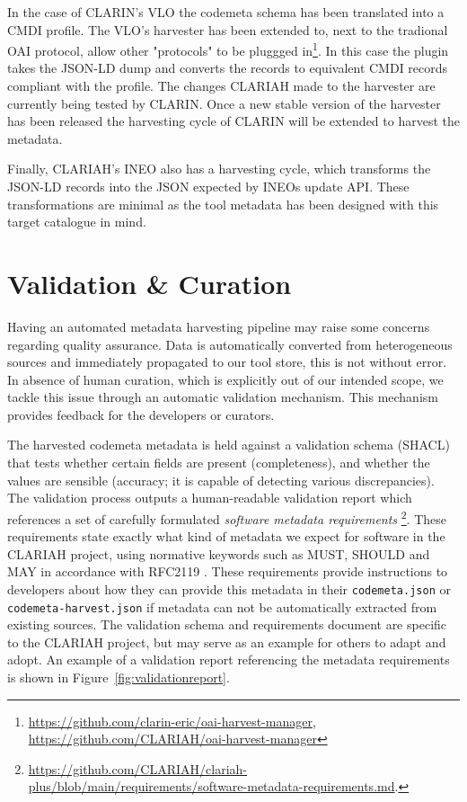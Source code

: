 \documentclass[a4paper,11pt]{article}
\begin{document}
In the case of CLARIN's VLO the codemeta schema has been translated into a CMDI
profile\citep{windhouwer2022component}. The VLO's harvester has been extended to, 
next to the tradional OAI protocol, allow other "protocols" to be pluggged
in\footnote{\url{https://github.com/clarin-eric/oai-harvest-manager}, 
\url{https://github.com/CLARIAH/oai-harvest-manager}}. In this case the plugin takes
the JSON-LD dump and converts the records to equivalent CMDI records compliant with
the profile. The changes CLARIAH made to the harvester are currently being tested by
CLARIN. Once a new stable version of the harvester has been released the harvesting
cycle of CLARIN will be extended to harvest the metadata.

Finally, CLARIAH's INEO also has a harvesting cycle, which transforms the JSON-LD records
into the JSON expected by INEOs update API. These transformations are minimal as the tool
metadata has been designed with this target catalogue in mind.

\section{Validation \& Curation}

Having an automated metadata harvesting pipeline may raise some concerns
regarding quality assurance. Data is automatically converted from heterogeneous
sources and immediately propagated to our tool store, this is not without
error. In absence of human curation, which is explicitly out of our intended
scope, we tackle this issue through an automatic validation mechanism. This mechanism provides
feedback for the developers or curators.

The harvested codemeta metadata is held against a validation schema (SHACL)
that tests whether certain fields are present (completeness), and whether the
values are sensible (accuracy; it is capable of detecting various
discrepancies). The validation process outputs a human-readable validation
report which references a set of carefully formulated \emph{software metadata
requirements}
\footnote{\url{https://github.com/CLARIAH/clariah-plus/blob/main/requirements/software-metadata-requirements.md}.}.
These requirements state exactly what kind of metadata we expect for software
in the CLARIAH project, using normative keywords such as \textsc{MUST}, \textsc{SHOULD} and \textsc{MAY}
in accordance with RFC2119 \citep{RFC2119}. These requirements provide
instructions to developers about how they can provide this metadata in
their \texttt{codemeta.json} or \texttt{codemeta-harvest.json} if metadata can not be
automatically extracted from existing sources. The validation schema and
requirements document are specific to the CLARIAH project, but may serve as an
example for others to adapt and adopt. An example of a validation report
referencing the metadata requirements is shown in
Figure~\ref{fig:validationreport}.
\end{document}
